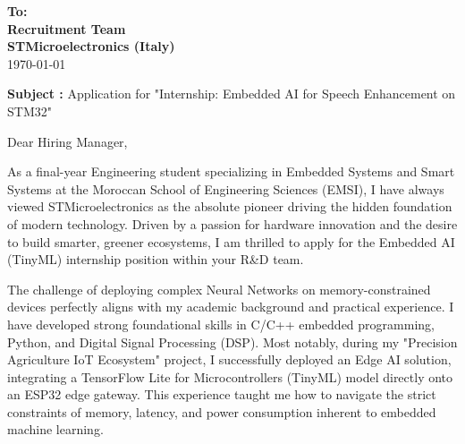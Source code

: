 \documentclass[10pt,a4paper]{altacv}
\makeatletter
\renewcommand{\makecvheader}{%
  \begingroup
    \raggedright\color{emphasis}%
    {\Huge\bfseries\MakeUppercase{\@name}\par}
    \medskip
    {\large\bfseries\color{accent}\@tagline\par}
    \medskip
    {\footnotesize\bfseries\@personalinfo\par}
  \endgroup\medskip
}
\makeatother
\begin{document}

\makecvheader

\bigskip

\begin{flushright}
  {\color{emphasis}\textbf{To:}} \\[2pt]
  \textbf{Recruitment Team} \\
  \textbf{STMicroelectronics (Italy)} \\[20pt]
  \today
\end{flushright}
\bigskip

\bigskip

{\color{accent}\textbf{Subject :}} Application for "Internship: Embedded AI for Speech Enhancement on STM32"

\bigskip\bigskip

Dear Hiring Manager,

\vspace{0.4cm}

As a final-year Engineering student specializing in Embedded Systems and Smart Systems at the Moroccan School of Engineering Sciences (EMSI), I have always viewed STMicroelectronics as the absolute pioneer driving the hidden foundation of modern technology. Driven by a passion for hardware innovation and the desire to build smarter, greener ecosystems, I am thrilled to apply for the Embedded AI (TinyML) internship position within your R\&D team.

\vspace{0.4cm}

The challenge of deploying complex Neural Networks on memory-constrained devices perfectly aligns with my academic background and practical experience. I have developed strong foundational skills in C/C++ embedded programming, Python, and Digital Signal Processing (DSP). Most notably, during my "Precision Agriculture IoT Ecosystem" project, I successfully deployed an Edge AI solution, integrating a TensorFlow Lite for Microcontrollers (TinyML) model directly onto an ESP32 edge gateway. This experience taught me how to navigate the strict constraints of memory, latency, and power consumption inherent to embedded machine learning.

\vspace{0.4cm}
\end{document}
